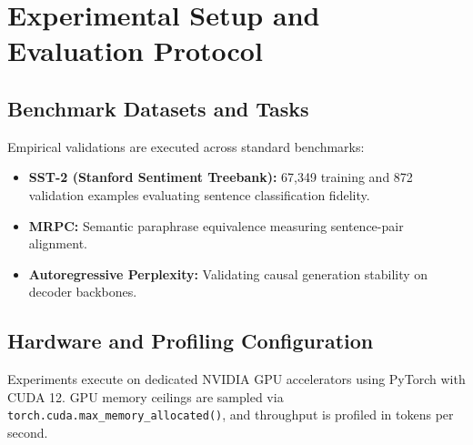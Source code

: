 \section{Experimental Setup and Evaluation Protocol}

\subsection{Benchmark Datasets and Tasks}
Empirical validations are executed across standard benchmarks:
\begin{itemize}
\item \textbf{SST-2 (Stanford Sentiment Treebank):} 67,349 training and 872 validation examples evaluating sentence classification fidelity.
\item \textbf{MRPC:} Semantic paraphrase equivalence measuring sentence-pair alignment.
\item \textbf{Autoregressive Perplexity:} Validating causal generation stability on decoder backbones.
\end{itemize}

\subsection{Hardware and Profiling Configuration}
Experiments execute on dedicated NVIDIA GPU accelerators using PyTorch with CUDA 12. GPU memory ceilings are sampled via \texttt{torch.cuda.max\_memory\_allocated()}, and throughput is profiled in tokens per second.
